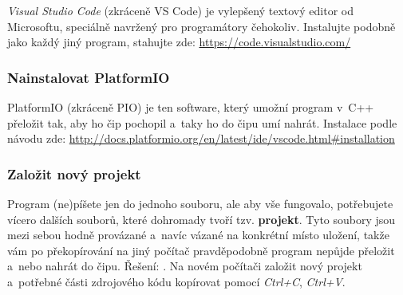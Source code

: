 {\it Visual Studio Code}  (zkráceně VS Code) 
je vylepšený textový editor od Microsoftu, speciálně navržený pro programátory čehokoliv.
Instalujte podobně jako každý jiný program, stahujte zde: \url{https://code.visualstudio.com/}  


\subsubsection{Nainstalovat PlatformIO} \label{platformio}

 PlatformIO (zkráceně PIO) je ten software, který umožní program v~C++ 
přeložit tak, aby ho čip pochopil a~taky ho do čipu umí nahrát. 
Instalace podle návodu zde: \url{http://docs.platformio.org/en/latest/ide/vscode.html\#installation}

\label{vsc:newproject} \subsubsection{Založit nový projekt}

Program (ne)píšete jen do jednoho souboru, ale aby vše fungovalo, potřebujete vícero dalších souborů, které dohromady tvoří tzv. {\bf projekt}.
Tyto soubory jsou mezi sebou hodně provázané a~navíc vázané na konkrétní místo uložení, 
takže vám po překopírování na jiný počítač pravděpodobně program nepůjde přeložit a~nebo 
nahrát do čipu. Řešení: . 
Na novém počítači založit nový projekt a~potřebné části zdrojového kódu kopírovat pomocí {\it Ctrl+C}, {\it Ctrl+V}. 



